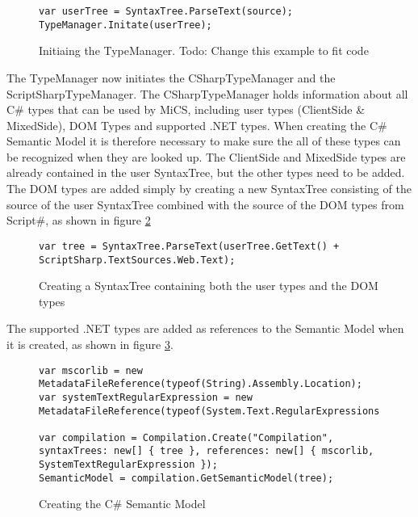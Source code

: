 \begin{figure}[H]
\begin{lstlisting}[language=CSharp,classoffset=1,morekeywords={TypeManager,SyntaxTree}]
var userTree = SyntaxTree.ParseText(source);
TypeManager.Initate(userTree);
\end{lstlisting}
\caption{Initiaing the TypeManager. Todo: Change this example to fit code}
\label{fig:init_mics_init_typemanager}
\end{figure}

The TypeManager now initiates the CSharpTypeManager and the ScriptSharpTypeManager. The CSharpTypeManager holds information about all C\# types that can be used by MiCS, including user types (ClientSide \& MixedSide), DOM Types and supported .NET types. When creating the C\# Semantic Model it is therefore necessary to make sure the all of these types can be recognized when they are looked up. The ClientSide and MixedSide types are already contained in the user SyntaxTree, but the other types need to be added. The DOM types are added simply by creating a new SyntaxTree consisting of the source of the user SyntaxTree combined with the source of the DOM types from Script\#, as shown in figure \ref{fig:init_mics_add_dom_types}

\begin{figure}[H]
\begin{lstlisting}[language=CSharp,classoffset=1,morekeywords={SyntaxTree}]
var tree = SyntaxTree.ParseText(userTree.GetText() + ScriptSharp.TextSources.Web.Text);
\end{lstlisting}
\caption{Creating a SyntaxTree containing both the user types and the DOM types}
\label{fig:init_mics_add_dom_types}
\end{figure}

The supported .NET types are added as references to the Semantic Model when it is created, as shown in figure \ref{fig:init_mics_create_semantic_model}.



\begin{figure}[H]
\begin{lstlisting}[language=CSharp,classoffset=1,morekeywords={MetadataFileReference,Regex,String,Compilation}]
var mscorlib = new MetadataFileReference(typeof(String).Assembly.Location);
var systemTextRegularExpression = new MetadataFileReference(typeof(System.Text.RegularExpressions.Regex).Assembly.Location);

var compilation = Compilation.Create("Compilation", syntaxTrees: new[] { tree }, references: new[] { mscorlib, SystemTextRegularExpression });
SemanticModel = compilation.GetSemanticModel(tree);
\end{lstlisting}
\caption{Creating the C\# Semantic Model}
\label{fig:init_mics_create_semantic_model}
\end{figure}

